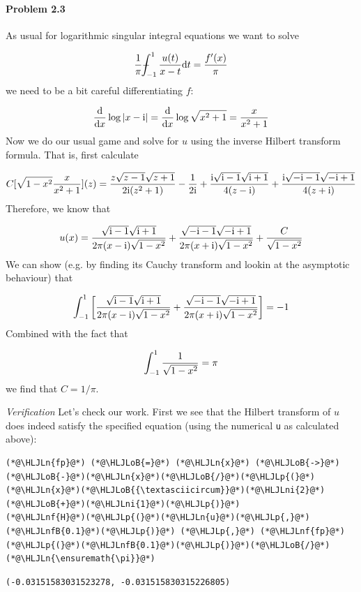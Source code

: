 \documentclass[12pt,a4paper]{article}
\newcommand{\HLJLn}[1]{#1}
\newcommand{\HLJLnf}[1]{\textcolor[RGB]{66,102,213}{#1}}
\newcommand{\HLJLnfB}[1]{\textcolor[RGB]{59,151,46}{#1}}
\newcommand{\HLJLni}[1]{\textcolor[RGB]{59,151,46}{#1}}
\newcommand{\HLJLoB}[1]{\textcolor[RGB]{102,102,102}{\textbf{#1}}}
\newcommand{\HLJLp}[1]{#1}
\def\D{ {\rm d} }
\def\I{ {\rm i} }
\def\Xint#1{ \mathchoice
   {\XXint\displaystyle\textstyle{#1} }%
   {\XXint\textstyle\scriptstyle{#1} }%
   {\XXint\scriptstyle\scriptscriptstyle{#1} }%
   {\XXint\scriptscriptstyle\scriptscriptstyle{#1} }%
   \!\int}
\def\XXint#1#2#3{ {\setbox0=\hbox{$#1{#2#3}{\int}$}
     \vcenter{\hbox{$#2#3$}}\kern-.5\wd0} }
\def\dashint{\Xint-}
\def\dx{\D x}
\def\dt{\D t}
\begin{document}
\paragraph{Problem 2.3}
As usual for logarithmic singular integral equations we want to solve

\[
{1 \over \pi} \dashint_{-1}^1 {u(t)  \over x-t} \dt = {f'(x)  \over \pi}
\]
we need to be a bit careful differentiating $f$:

\[
{\D \over \dx} \log|x-\I| = {\D \over \dx} \log\sqrt{x^2 + 1} = { x \over x^2 + 1}
\]
Now we do our usual game and solve for $u$ using the inverse Hilbert transform formula. That is, first calculate

\[
C[\sqrt{1-x^2} {x \over x^2+1}](z) = {z \sqrt{z-1} \sqrt{z+1} \over 2\I (z^2+1)} - {1 \over 2 \I} + {\I \sqrt{\I - 1} \sqrt{\I+1} \over 4 (z-\I)} +  {\I \sqrt{-\I - 1} \sqrt{-\I+1} \over 4 (z+\I)}
\]
Therefore, we know that

\[
u(x) =  {\sqrt{\I - 1} \sqrt{\I+1} \over 2 \pi (x-\I)\sqrt{1-x^2}} +  {\sqrt{-\I - 1} \sqrt{-\I+1} \over 2 \pi (x+\I) \sqrt{1-x^2}} + {C \over \sqrt{1-x^2}}
\]
We can show (e.g. by finding its Cauchy transform and lookin at the asymptotic behaviour) that

\[
\int_{-1}^1\left[ {\sqrt{\I - 1} \sqrt{\I+1} \over 2 \pi (x-\I)\sqrt{1-x^2}} +  {\sqrt{-\I - 1} \sqrt{-\I+1} \over 2 \pi (x+\I) \sqrt{1-x^2}} \right] = -1
\]
Combined with the fact that

\[
\int_{-1}^1 {1 \over \sqrt{1-x^2}} = \pi
\]
we find that $C = 1/\pi$.

\emph{Verification} Let's check our work. First we see that the Hilbert transform of $u$ does  indeed satisfy the specified equation (using the numerical \texttt{u} as calculated above):


\begin{lstlisting}
(*@\HLJLn{fp}@*) (*@\HLJLoB{=}@*) (*@\HLJLn{x}@*) (*@\HLJLoB{->}@*) (*@\HLJLoB{-}@*)(*@\HLJLn{x}@*)(*@\HLJLoB{/}@*)(*@\HLJLp{(}@*)(*@\HLJLn{x}@*)(*@\HLJLoB{{\textasciicircum}}@*)(*@\HLJLni{2}@*)(*@\HLJLoB{+}@*)(*@\HLJLni{1}@*)(*@\HLJLp{)}@*)
(*@\HLJLnf{H}@*)(*@\HLJLp{(}@*)(*@\HLJLn{u}@*)(*@\HLJLp{,}@*) (*@\HLJLnfB{0.1}@*)(*@\HLJLp{)}@*) (*@\HLJLp{,}@*) (*@\HLJLnf{fp}@*)(*@\HLJLp{(}@*)(*@\HLJLnfB{0.1}@*)(*@\HLJLp{)}@*)(*@\HLJLoB{/}@*)(*@\HLJLn{\ensuremath{\pi}}@*)
\end{lstlisting}

\begin{lstlisting}
(-0.03151583031523278, -0.031515830315226805)
\end{lstlisting}
\end{document}
